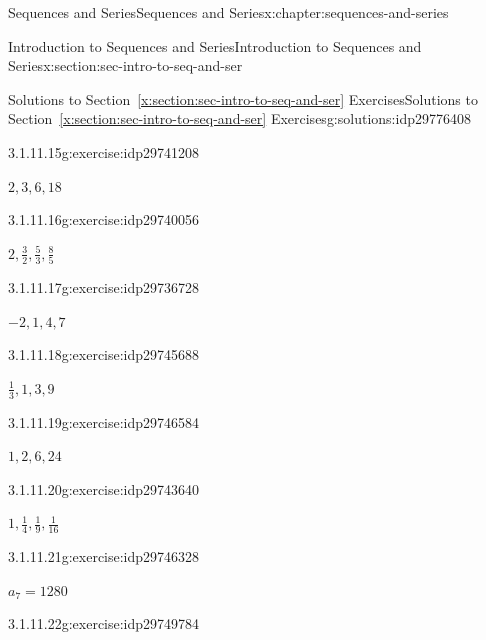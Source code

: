 \documentclass[twoside,10pt,]{book}
\newcommand{\xreffont}{\relax}
\numberwithin{equation}{section}
\begin{document}
\begin{chapterptx}{Sequences and Series}{}{Sequences and Series}{}{}{x:chapter:sequences-and-series}
\begin{sectionptx}{Introduction to Sequences and Series}{}{Introduction to Sequences and Series}{}{}{x:section:sec-intro-to-seq-and-ser}
\begin{solutions-subsection}{Solutions to Section~{\xreffont\ref*{x:section:sec-intro-to-seq-and-ser}} Exercises}{}{Solutions to Section~{\xreffont\ref*{x:section:sec-intro-to-seq-and-ser}} Exercises}{}{}{g:solutions:idp29776408}
\begin{exercisegroup}
\begin{divisionsolutioneg}{3.1.11.15}{}{g:exercise:idp29741208}%
\par\smallskip%
\noindent\hypertarget{g:solution:idp29739544-main}{}\(2, 3, 6, 18\)\end{divisionsolutioneg}%
\begin{divisionsolutioneg}{3.1.11.16}{}{g:exercise:idp29740056}%
\par\smallskip%
\noindent\hypertarget{g:solution:idp29743384-main}{}\(2,\frac{3}{2},\frac{5}{3},\frac{8}{5}\)\end{divisionsolutioneg}%
\end{exercisegroup}
\par\medskip\noindent
\begin{exercisegroup}
\begin{divisionsolutioneg}{3.1.11.17}{}{g:exercise:idp29736728}%
\par\smallskip%
\noindent\hypertarget{g:solution:idp29745944-main}{}\(-2, 1, 4, 7\)\end{divisionsolutioneg}%
\begin{divisionsolutioneg}{3.1.11.18}{}{g:exercise:idp29745688}%
\par\smallskip%
\noindent\hypertarget{g:solution:idp29745816-main}{}\(\frac{1}{3},1,3,9\)\end{divisionsolutioneg}%
\begin{divisionsolutioneg}{3.1.11.19}{}{g:exercise:idp29746584}%
\par\smallskip%
\noindent\hypertarget{g:solution:idp29746840-main}{}\(1, 2, 6, 24\)\end{divisionsolutioneg}%
\begin{divisionsolutioneg}{3.1.11.20}{}{g:exercise:idp29743640}%
\par\smallskip%
\noindent\hypertarget{g:solution:idp29748888-main}{}\(1,\frac{1}{4},\frac{1}{9},\frac{1}{16}\)\end{divisionsolutioneg}%
\end{exercisegroup}
\par\medskip\noindent
\begin{exercisegroup}
\begin{divisionsolutioneg}{3.1.11.21}{}{g:exercise:idp29746328}%
\par\smallskip%
\noindent\hypertarget{g:solution:idp29749656-main}{}\(a_7 = 1280\)\end{divisionsolutioneg}%
\begin{divisionsolutioneg}{3.1.11.22}{}{g:exercise:idp29749784}%
\par\smallskip%

\end{divisionsolutioneg}
\end{exercisegroup}
\end{solutions-subsection}
\end{sectionptx}
\end{chapterptx}
\end{document}
